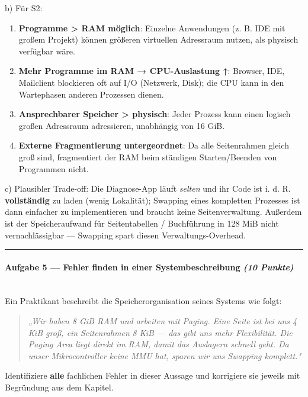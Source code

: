 \documentclass[11pt, a4paper]{article}
\begin{document}
b) Für S2:

\begin{enumerate}
  \item \textbf{Programme > RAM möglich}: Einzelne Anwendungen (z. B. IDE mit großem Projekt) können größeren virtuellen Adressraum nutzen, als physisch verfügbar wäre.
  \item \textbf{Mehr Programme im RAM → CPU-Auslastung ↑}: Browser, IDE, Mailclient blockieren oft auf I/O (Netzwerk, Disk); die CPU kann in den Wartephasen anderen Prozessen dienen.
  \item \textbf{Ansprechbarer Speicher > physisch}: Jeder Prozess kann einen logisch großen Adressraum adressieren, unabhängig von 16 GiB.
  \item \textbf{Externe Fragmentierung untergeordnet}: Da alle Seitenrahmen gleich groß sind, fragmentiert der RAM beim ständigen Starten/Beenden von Programmen nicht.
\end{enumerate}

c) Plausibler Trade-off: Die Diagnose-App läuft \textit{selten} und ihr Code ist i. d. R. \textbf{vollständig} zu laden (wenig Lokalität); Swapping eines kompletten Prozesses ist dann einfacher zu implementieren und braucht keine Seitenverwaltung. Außerdem ist der Speicheraufwand für Seitentabellen / Buchführung in 128 MiB nicht vernachlässigbar — Swapping spart diesen Verwaltungs-Overhead.



\noindent\textcolor{rulegray}{\rule{\linewidth}{0.4pt}}


\paragraph{Aufgabe 5 — Fehler finden in einer Systembeschreibung \textit{(10 Punkte)}}\mbox{}\\[2pt]

Ein Praktikant beschreibt die Speicherorganisation seines Systems wie folgt:


\begin{quote}
\textit{„Wir haben 8 GiB RAM und arbeiten mit Paging. Eine }\textit{Seite}\textit{ ist bei uns 4 KiB groß, ein }\textit{Seitenrahmen}\textit{ 8 KiB — das gibt uns mehr Flexibilität. Die }\textit{Paging Area}\textit{ liegt direkt im RAM, damit das Auslagern schnell geht. Da unser Mikrocontroller keine MMU hat, sparen wir uns Swapping komplett."}
\end{quote}

Identifiziere \textbf{alle} fachlichen Fehler in dieser Aussage und korrigiere sie jeweils mit Begründung aus dem Kapitel.
\end{document}
